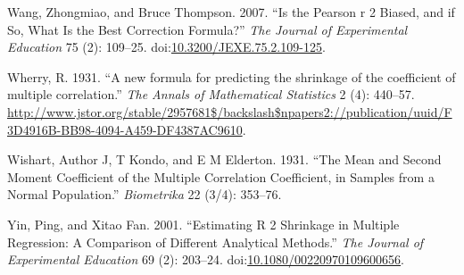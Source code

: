 \documentclass[]{article}
\begin{document}
\hypertarget{ref-Wang2007}{}
Wang, Zhongmiao, and Bruce Thompson. 2007. ``Is the Pearson r 2 Biased,
and if So, What Is the Best Correction Formula?'' \emph{The Journal of
Experimental Education} 75 (2): 109--25.
doi:\href{https://doi.org/10.3200/JEXE.75.2.109-125}{10.3200/JEXE.75.2.109-125}.

\hypertarget{ref-Wherry1931}{}
Wherry, R. 1931. ``A new formula for predicting the shrinkage of the
coefficient of multiple correlation.'' \emph{The Annals of Mathematical
Statistics} 2 (4): 440--57.
\url{http://www.jstor.org/stable/2957681$/backslash$npapers2://publication/uuid/F3D4916B-BB98-4094-A459-DF4387AC9610}.

\hypertarget{ref-Wishart1931}{}
Wishart, Author J, T Kondo, and E M Elderton. 1931. ``The Mean and
Second Moment Coefficient of the Multiple Correlation Coefficient, in
Samples from a Normal Population.'' \emph{Biometrika} 22 (3/4): 353--76.

\hypertarget{ref-Yin2001}{}
Yin, Ping, and Xitao Fan. 2001. ``Estimating R 2 Shrinkage in Multiple
Regression: A Comparison of Different Analytical Methods.'' \emph{The
Journal of Experimental Education} 69 (2): 203--24.
doi:\href{https://doi.org/10.1080/00220970109600656}{10.1080/00220970109600656}.
\end{document}
